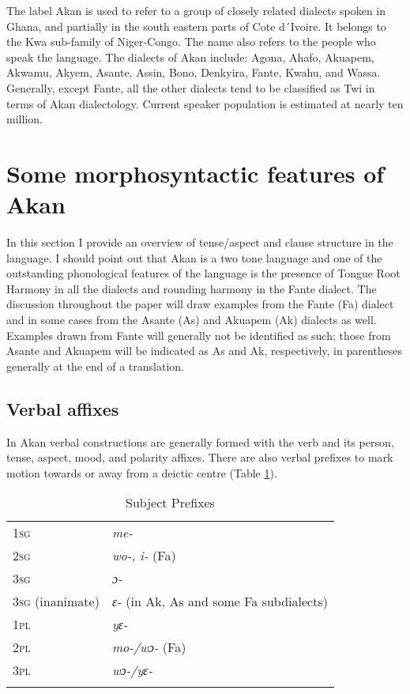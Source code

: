 \documentclass[output=paper]{langsci/langscibook}
\begin{document}
The label Akan is used to refer to a group of closely related dialects spoken in Ghana, and partially in the south eastern parts of Cote d´Ivoire. It belongs to the Kwa sub-family of Niger-Congo. The name also refers to the people who speak the language. The dialects of Akan include: Agona, Ahafo, Akuapem, Akwamu, Akyem, Asante, Assin, Bono, Denkyira, Fante, Kwahu, and Wassa. Generally, except Fante, all the other dialects tend to be classified as Twi in terms of Akan dialectology. Current speaker population is estimated at nearly ten million.

\section{Some morphosyntactic features of Akan}\label{§2:morphosyntactic.osam}

In this section I provide an overview of tense/aspect and clause structure in the language. I should point out that Akan is a two tone language and one of the outstanding phonological features of the language is the presence of Tongue Root Harmony in all the dialects and rounding harmony in the Fante dialect. The discussion throughout the paper will draw examples from the Fante (Fa) dialect and in some cases from the Asante (As) and Akuapem (Ak) dialects as well. Examples drawn from Fante will generally not be identified as such; those from Asante and Akuapem will be indicated as As and Ak, respectively, in parentheses generally at the end of a translation.

\subsection{Verbal affixes}\label{§2.1:verbal.osam}

In Akan verbal constructions are generally formed with the verb and its person, tense, aspect, mood, and polarity affixes. There are also verbal prefixes to mark motion towards or away from a deictic centre (Table \ref{tab:1.osam}).

\begin{table}
\begin{tabular}{ll}
\lsptoprule
     \textsc{1sg} & \textit{me-}\\
     \textsc{2sg} & \textit{wo-, i-} (Fa)\\
     \textsc{3sg} & \textit{ɔ-}\\
     \textsc{3sg} (inanimate) & \textit{ɛ-} (in Ak, As and some Fa subdialects)\\
     \textsc{1pl} & \textit{yɛ-}\\
     \textsc{2pl} & \textit{mo-/wɔ-} (Fa)\\
     \textsc{3pl} & \textit{wɔ-/yɛ-}\\
\lspbottomrule
\end{tabular}
\caption {Subject Prefixes}
\label{tab:1.osam}
\end{table}
\end{document}
